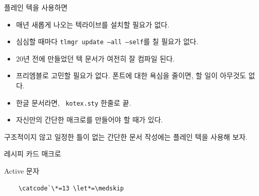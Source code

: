 \documentclass{beamer}
\begin{document}
%
\begin{frame}{플레인 텍을 사용하면}
  \begin{itemize}
  \item 매년 새롭게 나오는 텍라이브를 설치할 필요가 없다.
  \item 심심할 때마다 {\small\alert{\texttt{tlmgr update --all --self}}}를
    칠 필요가 없다.
  \item 20년 전에 만들었던 텍 문서가 여전히 잘 컴파일 된다.
  \item 프리엠블로 고민할 필요가 없다. 폰트에 대한 욕심을 줄이면, 할 일이 아무것도 없다.
  \item 한글 문서라면, {\small\alert{\texttt{\string\ kotex.sty}}}
    한줄로 끝.
  \item {\scriptsize 자신만의 간단한 매크로를 만들어야 할 때가 있다.}
  \end{itemize}
  
  구조적이지 않고 일정한 틀이 없는 간단한 문서 작성에는 플레인 텍을 사용해 보자.
\end{frame}


%
\begin{frame}[standout]
  레시피 카드 매크로
\end{frame}


%
\begin{frame}[fragile]{Active 문자}
  \begin{Verbatim}
    \catcode`\*=13 \let*=\medskip
  \end{Verbatim}
\end{frame}
\end{document}
